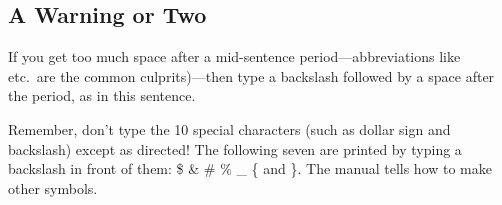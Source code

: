 \subsection{A Warning or Two}  %

If you get too much space after a mid-sentence period---abbreviations
like etc.\ are the common culprits)---then type a backslash followed by
a space after the period, as in this sentence.

Remember, don't type the 10 special characters (such as dollar sign and
backslash) except as directed!  The following seven are printed by
typing a backslash in front of them:  \$  \&  \#  \%  \_  \{  and  \}.  
The manual tells how to make other symbols.

\bigskip\vfil
{}%

